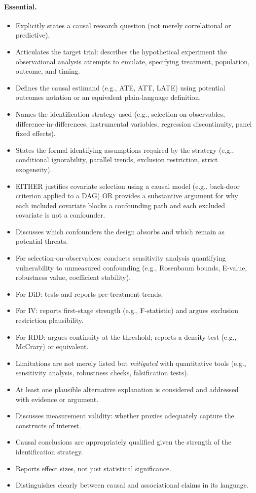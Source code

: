 \paragraph{Essential.}
\begin{itemize}[leftmargin=15pt]
    \item Explicitly states a causal research question (not merely correlational or predictive).
    \item Articulates the target trial: describes the hypothetical experiment the observational analysis attempts to emulate, specifying treatment, population, outcome, and timing.
    \item Defines the causal estimand (e.g., ATE, ATT, LATE) using potential outcomes notation or an equivalent plain-language definition.
    \item Names the identification strategy used (e.g., selection-on-observables, difference-in-differences, instrumental variables, regression discontinuity, panel fixed effects).
    \item States the formal identifying assumptions required by the strategy (e.g., conditional ignorability, parallel trends, exclusion restriction, strict exogeneity).
    \item EITHER justifies covariate selection using a causal model (e.g., back-door criterion applied to a DAG) OR provides a substantive argument for why each included covariate blocks a confounding path and each excluded covariate is not a confounder.
    \item Discusses which confounders the design absorbs and which remain as potential threats.
    \item For selection-on-observables: conducts sensitivity analysis quantifying vulnerability to unmeasured confounding (e.g., Rosenbaum bounds, E-value, robustness value, coefficient stability).
    \item For DiD: tests and reports pre-treatment trends.
    \item For IV: reports first-stage strength (e.g., F-statistic) and argues exclusion restriction plausibility.
    \item For RDD: argues continuity at the threshold; reports a density test (e.g., McCrary) or equivalent.
    \item Limitations are not merely listed but \emph{mitigated} with quantitative tools (e.g., sensitivity analysis, robustness checks, falsification tests).
    \item At least one plausible alternative explanation is considered and addressed with evidence or argument.
    \item Discusses measurement validity: whether proxies adequately capture the constructs of interest.
    \item Causal conclusions are appropriately qualified given the strength of the identification strategy.
    \item Reports effect sizes, not just statistical significance.
    \item Distinguishes clearly between causal and associational claims in its language.
\end{itemize}


